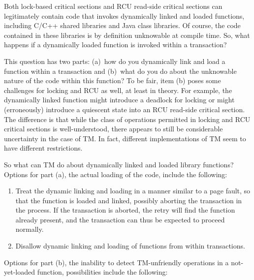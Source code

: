 Both lock-based critical sections and RCU read-side critical sections
can legitimately contain code that invokes dynamically linked and loaded
functions, including C/C++ shared libraries and Java class libraries.
Of course, the code contained in these libraries is by definition
unknowable at compile time.
So, what happens if a dynamically loaded function is invoked within
a transaction?

This question has two parts: (a)~how do you dynamically link and load a
function within a transaction and (b)~what do you do about the unknowable
nature of the code within this function?
To be fair, item (b) poses some challenges for locking and RCU as well,
at least in theory.
For example, the dynamically linked function might introduce a deadlock
for locking or might (erroneously) introduce a quiescent state into an
RCU read-side critical section.
The difference is that while the class of operations permitted in locking
and RCU critical sections is well-understood, there appears to still be
considerable uncertainty in the case of TM.
In fact, different implementations of TM seem to have different restrictions.

So what can TM do about dynamically linked and loaded library functions?
Options for part (a), the actual loading of the code, include the following:

\begin{enumerate}
\item	Treat the dynamic linking and loading in a manner similar to a
	page fault, so that the function is loaded and linked, possibly
	aborting the transaction in the process.
	If the transaction is aborted, the retry will find the function
	already present, and the transaction can thus be expected to
	proceed normally.
\item	Disallow dynamic linking and loading of functions from within
	transactions.
\end{enumerate}

Options for part (b), the inability to detect TM-unfriendly operations
in a not-yet-loaded function, possibilities include the following:


